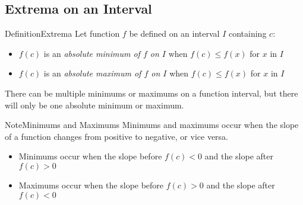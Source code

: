 \documentclass{MathNotes}
\newenvironment{definition}[1]{\begin{RedBox}{Definition}{#1}}{\end{RedBox}}
\newenvironment{note}[1]{\begin{YellowBox}{Note}{#1}}{\end{YellowBox}}
\begin{document}
\subsection{Extrema on an Interval}
\begin{definition}{Extrema}
    Let function $f$ be defined on an interval $I$ containing $c$:
    \begin{itemize}
        \item $f(c)$ is an \textit{absolute minimum of $f$ on $I$} when $f(c)\leq f(x)$
            for $x$ in $I$
        \item $f(c)$ is an \textit{absolute maximum of $f$ on $I$} when $f(c)\leq f(x)$
            for $x$ in $I$
    \end{itemize}

    There can be multiple minimums or maximums on a function interval, but
    there will only be one absolute minimum or maximum.
\end{definition}

\begin{note}{Minimums and Maximums}
    Minimums and maximums occur when the slope of a function changes
    from positive to negative, or vice versa. 
    \begin{itemize}
        \item Minimums occur when the slope before $f(c)<0$ and the slope after
            $f(c)>0$
        \item Maximums occur when the slope before $f(c)>0$ and the slope after
            $f(c)<0$
    \end{itemize}
\end{note}
\end{document}
